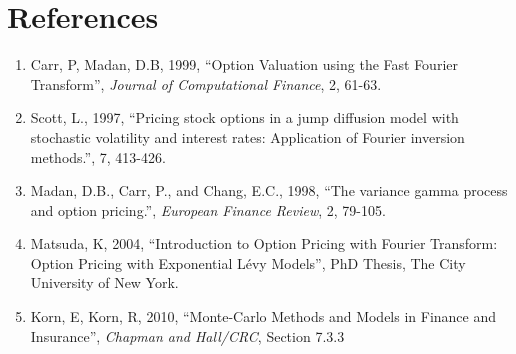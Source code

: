 \documentclass[11pt]{article}
\begin{document}
	
	\section{References}
	\begin{enumerate}
		\item Carr, P, Madan, D.B, 1999, ``Option Valuation using the Fast Fourier Transform'', \textit{Journal of Computational Finance}, 2, 61-63.
		\item Scott, L., 1997, ``Pricing stock options in a jump diffusion model with stochastic
		volatility and interest rates: Application of Fourier inversion methods.'', 7, 413-426.
		\item Madan, D.B., Carr, P., and Chang, E.C., 1998, ``The variance gamma process and
		option pricing.'', \textit{European Finance Review}, 2, 79-105.
		\item Matsuda, K, 2004, ``Introduction to Option Pricing with Fourier Transform: Option Pricing with Exponential L\'evy Models'', PhD Thesis, The City University of New York.
		\item Korn, E, Korn, R, 2010, ``Monte-Carlo Methods and Models in Finance and Insurance'', \textit{Chapman and Hall/CRC}, Section 7.3.3
	\end{enumerate}
	
\end{document}
